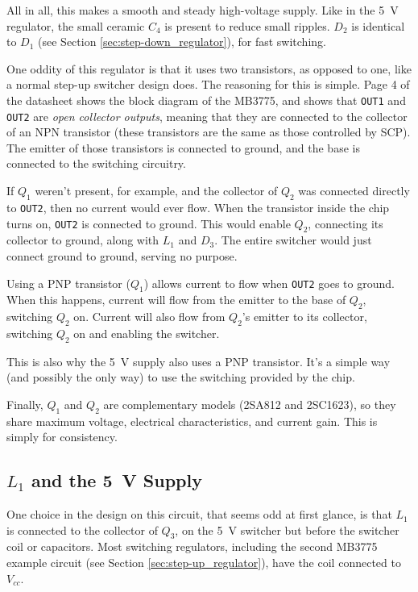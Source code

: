 \documentclass{article}
\newcommand{\Vcc}{$V_{cc}$}
\newcommand{\chippin}{\texttt}
\newcommand{\model}{\textsf}
\begin{document}
All in all, this makes a smooth and steady high-voltage supply. Like
in the \qty{5}{\volt} regulator, the small ceramic $C_4$ is present to
reduce small ripples. $D_2$ is identical to $D_1$ (see Section
\ref{sec:step-down_regulator}), for fast switching.

One oddity of this regulator is that it uses two transistors, as
opposed to one, like a normal step-up switcher design does. The
reasoning for this is simple. Page 4 of the datasheet shows the block
diagram of the \model{MB3775}, and shows that \chippin{OUT1} and
\chippin{OUT2} are \textit{open collector outputs}, meaning that they
are connected to the collector of an NPN transistor (these transistors
are the same as those controlled by SCP). The emitter of those
transistors is connected to ground, and the base is connected to the
switching circuitry.

If $Q_1$ weren't present, for example, and the collector of $Q_2$ was
connected directly to \chippin{OUT2}, then no current would ever
flow. When the transistor inside the chip turns on, \chippin{OUT2} is
connected to ground. This would enable $Q_2$, connecting its collector
to ground, along with $L_1$ and $D_3$. The entire switcher would just
connect ground to ground, serving no purpose.

Using a PNP transistor ($Q_1$) allows current to flow when
\chippin{OUT2} goes to ground. When this happens, current will flow
from the emitter to the base of $Q_2$, switching $Q_2$ on. Current
will also flow from $Q_2$'s emitter to its collector, switching $Q_2$
on and enabling the switcher.

This is also why the \qty{5}{\volt} supply also uses a PNP
transistor. It's a simple way (and possibly the only way) to use the
switching provided by the chip.

Finally, $Q_1$ and $Q_2$ are complementary models (\model{2SA812} and
\model{2SC1623}), so they share maximum voltage, electrical
characteristics, and current gain. This is simply for consistency.

\subsection{$L_1$ and the \qty{5}{\volt} Supply}
\label{sec:l1_and_5v}
One choice in the design on this circuit, that seems odd at first
glance, is that $L_1$ is connected to the collector of $Q_3$, on the
\qty{5}{\volt} switcher but before the switcher coil or
capacitors. Most switching regulators, including the second
\model{MB3775} example circuit (see Section
\ref{sec:step-up_regulator}), have the coil connected to \Vcc{}.
\end{document}
